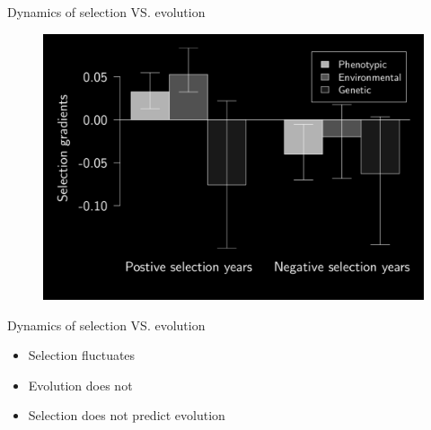 \documentclass[10pt]{beamer}%
\begin{document}
\begin{frame}{Dynamics of selection VS. evolution}
	\begin{figure}
		\includegraphics[width=\textwidth]{Figures/Betas-1}
	\end{figure}
\end{frame} 

\begin{frame}{Dynamics of selection VS. evolution}

	\begin{itemize}[<+->]
		\item Selection fluctuates
		\item Evolution does not
		\item Selection does not predict evolution
	\end{itemize}
	
\end{frame}

\end{document}

